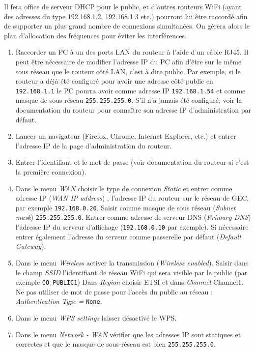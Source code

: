 \documentclass[a4paper]{ffco-rapport}
\begin{document}
	Il fera office de serveur DHCP pour le public, et d'autres routeurs WiFi (ayant des adresses du type 192.168.1.2, 192.168.1.3 etc.) pourront lui être raccordé afin de supporter un plus grand nombre de connexions simultanées. On gèrera alors le plan d'allocation des fréquences pour éviter les interférences.
	
	
	\begin{enumerate}
		\item Raccorder un PC à un des ports LAN du routeur à l'aide d'un câble RJ45.
					Il peut être nécessaire de modifier l'adresse IP du PC afin d'être sur le même sous réseau que le routeur côté LAN, c'est à dire public.
					Par exemple, si le routeur a déjà été configuré pour avoir une adresse côté public en \texttt{192.168.1.1} le PC pourra avoir comme adresse IP \texttt{192.168.1.54} et comme masque de sous réseau \texttt{255.255.255.0}. S'il n'a jamais été configuré, voir la documentation du routeur pour connaître son adresse IP d'administration par défaut.
		\item Lancer un navigateur (Firefox, Chrome, Internet Explorer, etc.) et entrer l'adresse IP de la page d'administration du routeur.
		\item Entrer l'identifiant et le mot de passe (voir documentation du routeur si c'est la première connexion).
		\item Dans le menu \emph{WAN} choisir le type de connexion \emph{Static} et entrer comme adresse IP (\emph{WAN IP address}) , l'adresse IP du routeur sur le réseau
					de GEC, par exemple \texttt{192.168.0.20}. Saisir comme masque de sous réseau (\emph{Subnet mask}) \texttt{255.255.255.0}.
					Entrer comme adresse de serveur DNS (\emph{Primary DNS}) l'adresse IP du serveur d'affichage (\texttt{192.168.0.10} par exemple).
					Si nécessaire entrer également l'adresse du serveur comme passerelle par défaut (\emph{Default Gateway}).
		\item Dans le menu \emph{Wireless} activer la transmission (\emph{Wireless enabled}).
					Saisir dans le champ \emph{SSID} l'identifiant de réseau WiFi qui sera visible par le public (par exemple \texttt{CO\_PUBLIC1})
					Dans \emph{Region} choisir ETSI et dans \emph{Channel} Channel1. Ne pas utiliser de mot de passe pour l'accès du public au réseau : \emph{Authentication Type =} \texttt{None}.
		\item Dans le menu \emph{WPS settings} laisser désactivé le WPS.
		\item Dans le menu \emph{Network - WAN} vérifier que les adresses IP sont statiques et correctes et que le masque de sous-réseau est bien \texttt{255.255.255.0}.

\end{enumerate}
\end{document}
